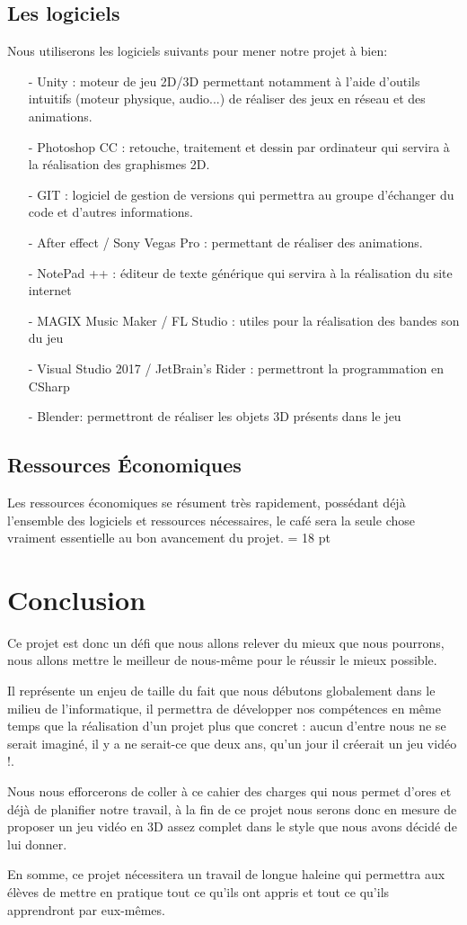 \documentclass[12pt,a4paper]{article}
\begin{document}
\subsection{Les logiciels}
Nous utiliserons les logiciels suivants pour mener notre projet à bien:
\begin{itemize}
\item[-] Unity : moteur de jeu 2D/3D permettant notamment à l'aide d'outils
intuitifs (moteur physique, audio...) de réaliser des jeux en réseau et
des animations.
\item[-] Photoshop CC : retouche, traitement et dessin par
ordinateur qui servira à la réalisation des graphismes 2D.
\item[-] GIT : logiciel de gestion de versions qui permettra au groupe d'échanger du code et d’autres informations.
\item[-] After effect / Sony Vegas Pro : permettant de réaliser des animations.
\item[-] NotePad ++ : éditeur de texte générique qui servira à la réalisation
du site internet
\item[-] MAGIX Music Maker / FL Studio : utiles pour la
réalisation des bandes son du jeu
\item[-] Visual Studio 2017 / JetBrain's Rider : permettront la programmation en CSharp
\item[-] Blender: permettront de réaliser les objets 3D présents dans le jeu
\end{itemize}
\subsection{Ressources Économiques}
Les ressources économiques se résument très rapidement, possédant déjà l'ensemble des logiciels et ressources nécessaires, le café sera la seule chose vraiment essentielle au bon avancement du projet.
\newpage
\baselineskip = 18 pt
\section{Conclusion}
Ce projet est donc un défi que nous allons relever du mieux que nous pourrons, nous allons mettre le meilleur de nous-même pour le réussir le mieux possible.

Il représente un enjeu de taille du fait que nous débutons globalement dans le milieu de l'informatique, il permettra de développer nos compétences en même temps que la réalisation d'un projet plus que concret : aucun d'entre nous ne se serait imaginé, il y a ne serait-ce que deux ans, qu'un jour il créerait un jeu vidéo !.

Nous nous efforcerons de coller à ce cahier des charges qui nous permet d'ores et déjà de planifier notre travail, à la fin de ce projet nous serons donc en mesure de proposer un jeu vidéo en 3D assez complet dans le style que nous avons décidé de lui donner.

En somme, ce projet nécessitera un travail de longue haleine qui permettra aux élèves de mettre en pratique tout ce qu'ils ont appris et tout ce qu'ils apprendront par eux-mêmes.
\end{document}

